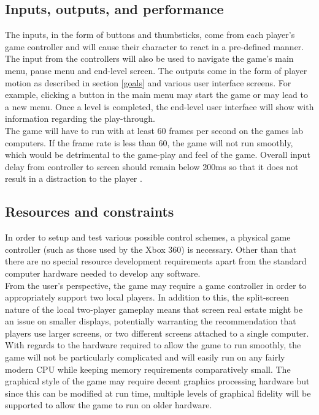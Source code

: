 \documentclass[a4paper,10pt]{article}
\begin{document}
\subsection{Inputs, outputs, and performance}
The inputs, in the form of buttons and thumbsticks, come from each player's game controller and will cause their character to react in a pre-defined manner. The input from the controllers will also be used to navigate the game's main menu, pause menu and end-level screen. The outputs come in the form of player motion as described in section \ref{goals} and various user interface screens. For example, clicking a button in the main menu may start the game or may lead to a new menu. Once a level is completed, the end-level user interface will show with information regarding the play-through.\smallskip\\The game will have to run with at least 60 frames per second on the games lab computers. If the frame rate is less than 60, the game will not run smoothly, which would be detrimental to the game-play and feel of the game. Overall input delay from controller to screen should remain below 200ms so that it does not result in a distraction to the player \cite{Leadbetter09}.

\subsection{Resources and constraints}
In order to setup and test various possible control schemes, a physical game controller (such as those used by the Xbox 360) is necessary. Other than that there are no special resource development requirements apart from the standard computer hardware needed to develop any software. \\
From the user's perspective, the game may require a game controller in order to appropriately support two local players. In addition to this, the split-screen nature of the local two-player gameplay means that screen real estate might be an issue on smaller displays, potentially warranting the recommendation that players use larger screens, or two different screens attached to a single computer. \\
With regards to the hardware required to allow the game to run smoothly, the game will not be particularly complicated and will easily run on any fairly modern CPU while keeping memory requirements comparatively small. The graphical style of the game may require decent graphics processing hardware but since this can be modified at run time, multiple levels of graphical fidelity will be supported to allow the game to run on older hardware.
\end{document}
